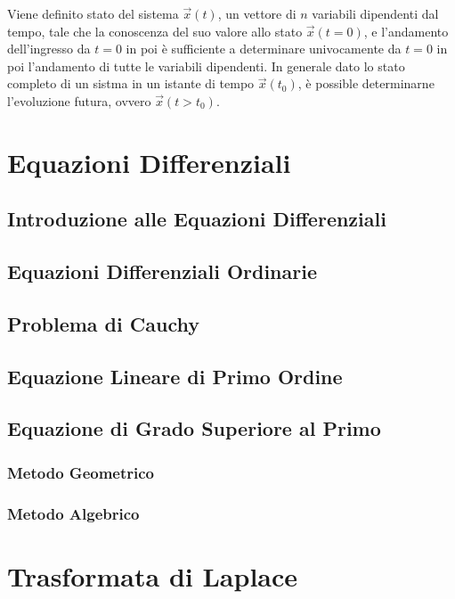 \documentclass{article}
\numberwithin{equation}{subsection}
\begin{document}
Viene definito stato del sistema $\vec{x}(t)$, un vettore di $n$ variabili dipendenti dal tempo, tale che la conoscenza del suo valore 
allo stato $\vec{x}(t=0)$, e l'andamento dell'ingresso da $t=0$ in poi è sufficiente a determinare univocamente da $t=0$ in poi l'andamento di tutte le 
variabili dipendenti. 
In generale dato lo stato completo di un sistma in un istante di tempo $\vec{x}(t_0)$, è possible determinarne l'evoluzione futura, ovvero 
$\vec{x}(t>t_0)$. 

\clearpage

\section{Equazioni Differenziali}

\subsection{Introduzione alle Equazioni Differenziali}

\subsection{Equazioni Differenziali Ordinarie}

\subsection{Problema di Cauchy}

\subsection{Equazione Lineare di Primo Ordine}

\subsection{Equazione di Grado Superiore al Primo}

\subsubsection{Metodo Geometrico}

\subsubsection{Metodo Algebrico}

\clearpage

\section{Trasformata di Laplace}
\end{document}
